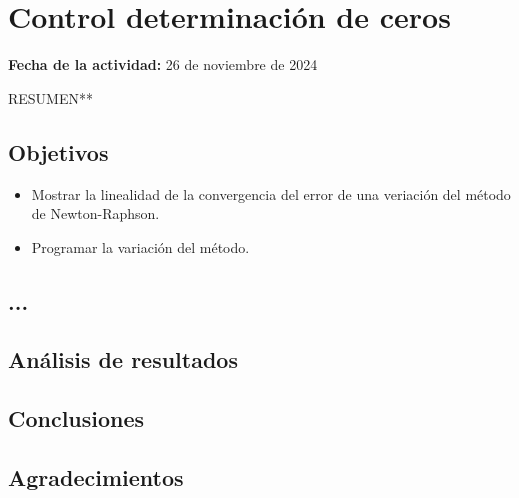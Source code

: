 \documentclass[../portafolio.tex]{subfiles}
\begin{document}
\chapter{Control determinación de ceros}
\label{guia:2_derivadas_8}
\hfill \textbf{Fecha de la actividad:} 26 de noviembre de 2024

\medskip

RESUMEN**

\section{Objetivos}
\begin{itemize}
\item Mostrar la linealidad de la convergencia del error de una veriación del método de Newton-Raphson.
\item Programar la variación del método.
\end{itemize}

\section{...}





\section{Análisis de resultados}

\section*{Conclusiones}

\section*{Agradecimientos}
\end{document}
